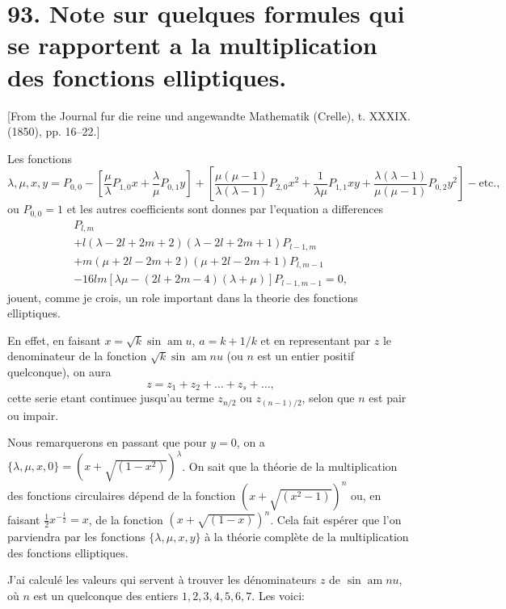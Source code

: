 \documentclass[11pt,a4paper]{book}
\begin{document}
\newpage

\section*{93. Note sur quelques formules qui se rapportent a la multiplication des fonctions elliptiques.}

[From the Journal fur die reine und angewandte Mathematik (Crelle), t. XXXIX. (1850), pp. 16--22.]

Les fonctions
\[
{\lambda, \mu, x, y} = P_{0,0} - [\frac{\mu}{\lambda} P_{1,0} x + \frac{\lambda}{\mu} P_{0,1} y] + [\frac{\mu(\mu-1)}{\lambda(\lambda-1)} P_{2,0} x^2 + \frac{1}{\lambda\mu} P_{1,1} xy + \frac{\lambda(\lambda-1)}{\mu(\mu-1)} P_{0,2} y^2] - \text{etc.},
\]
ou $P_{0,0} = 1$ et les autres coefficients sont donnes par l'equation a differences
\begin{multline*}
[-l\lambda - m\mu + (l - m)^2] P_{l,m} \\
+ l(\lambda - 2l + 2m + 2)(\lambda - 2l + 2m + 1) P_{l-1,m} \\
+ m(\mu + 2l - 2m + 2)(\mu + 2l - 2m + 1) P_{l,m-1} \\
- 16lm[\lambda\mu - (2l + 2m - 4)(\lambda + \mu)] P_{l-1,m-1} = 0,
\end{multline*}
jouent, comme je crois, un role important dans la theorie des fonctions elliptiques.

En effet, en faisant $x = \sqrt{k} \sin \operatorname{am} u$, $a = k + 1/k$ et en representant par $z$ le denominateur de la fonction $\sqrt{k} \sin \operatorname{am} nu$ (ou $n$ est un entier positif quelconque), on aura
\[
z = z_1 + z_2 + \ldots + z_s + \ldots,
\]
cette serie etant continuee jusqu'au terme $z_{n/2}$ ou $z_{(n-1)/2}$, selon que $n$ est pair ou impair.

Nous remarquerons en passant que pour $y = 0$, on a $\{\lambda, \mu, x, 0\} = (x + \sqrt{(1 - x^2)})^{\lambda}$. On sait que la th\'{e}orie de la multiplication des fonctions circulaires d\'{e}pend de la fonction $(x + \sqrt{(x^2 - 1)})^n$ ou, en faisant $\frac{1}{2}x^{-\frac{1}{2}} = x$, de la fonction $(x + \sqrt{(1 - x)})^n$. Cela fait esp\'{e}rer que l'on parviendra par les fonctions $\{\lambda, \mu, x, y\}$ \`{a} la th\'{e}orie compl\`{e}te de la multiplication des fonctions elliptiques.

J'ai calcul\'{e} les valeurs qui servent \`{a} trouver les d\'{e}nominateurs $z$ de $\sin \operatorname{am} nu$, o\`{u} $n$ est un quelconque des entiers $1, 2, 3, 4, 5, 6, 7$. Les voici:
\end{document}
